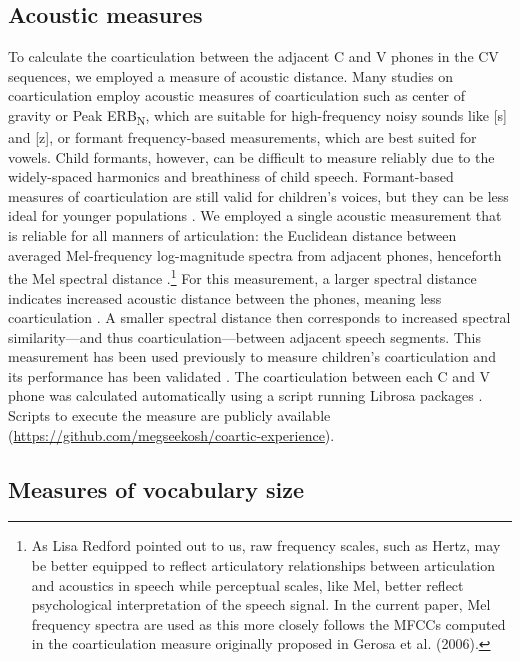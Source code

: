 \documentclass[a4paper,man,natbib,donotrepeattitle, apacite]{apa6}
\begin{document}
\subsection{Acoustic measures}

To calculate the coarticulation between the adjacent C and V phones in the CV sequences, we employed a measure of acoustic distance. Many studies on coarticulation employ acoustic measures of coarticulation such as center of gravity or Peak ERB\textsubscript{N}, which are suitable for high-frequency noisy sounds like [s] and [z], or formant frequency-based measurements, which are best suited for vowels. Child formants, however, can be difficult to measure reliably due to the widely-spaced harmonics and breathiness of child speech. Formant-based measures of coarticulation are still valid for children's voices, but they can be less ideal for younger populations \cite{leeAcousticsChildrenSpeech1999}. We employed a single acoustic measurement that is reliable for all manners of articulation: the Euclidean distance between averaged Mel-frequency log-magnitude spectra from adjacent phones, henceforth the Mel spectral distance \cite{cychoszSpectralTemporalMeasures2019,gerosaAnalyzingChildrenSpeech2006}.\footnote{As Lisa Redford pointed out to us, raw frequency scales, such as Hertz, may be better equipped to reflect articulatory relationships between articulation and acoustics in speech while perceptual scales, like Mel, better reflect psychological interpretation of the speech signal. In the current paper, Mel frequency spectra are used as this more closely follows the MFCCs computed in the coarticulation measure originally proposed in Gerosa et al. (2006).} For this measurement, a larger spectral distance indicates increased acoustic distance between the phones, meaning less coarticulation \cite{gerosaAnalyzingChildrenSpeech2006}. A smaller spectral distance then corresponds to increased spectral similarity---and thus coarticulation---between adjacent speech segments. This measurement has been used previously to measure children’s coarticulation \cite{gerosaAnalyzingChildrenSpeech2006} and its performance has been validated \cite{cychoszSpectralTemporalMeasures2019}. The coarticulation between each C and V phone was calculated automatically using a script running Librosa packages \cite{mcfeeLibrosaAudioMusic2015}. Scripts to execute the measure are publicly available (\url{https://github.com/megseekosh/coartic-experience}). 

\subsection{Measures of vocabulary size}
\end{document}
